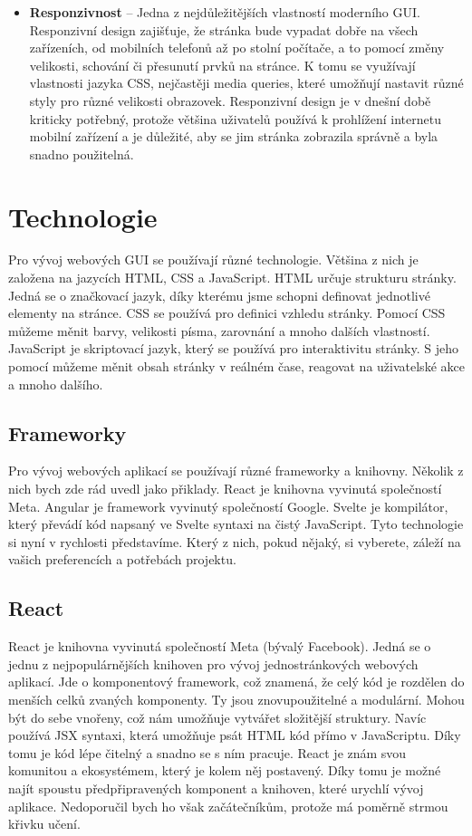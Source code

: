 \begin{itemize}
  \item \textbf{Responzivnost} -- Jedna z nejdůležitějších vlastností moderního GUI. Responzivní design zajišťuje, že stránka bude vypadat dobře na všech zařízeních, od mobilních telefonů až po stolní počítače, a to pomocí změny velikosti, schování či přesunutí prvků na stránce. K tomu se využívají vlastnosti jazyka CSS, nejčastěji media queries, které umožňují nastavit různé styly pro různé velikosti obrazovek. Responzivní design je v dnešní době kriticky potřebný, protože většina uživatelů používá k prohlížení internetu mobilní zařízení a je důležité, aby se jim stránka zobrazila správně a byla snadno použitelná.
\end{itemize}

\section{Technologie}
\label{sec:technologies}

Pro vývoj webových GUI se používají různé technologie. Většina z nich je založena na jazycích HTML, CSS a JavaScript. HTML určuje strukturu stránky. Jedná se o značkovací jazyk, díky kterému jsme schopni definovat jednotlivé elementy na stránce. CSS se používá pro definici vzhledu stránky. Pomocí CSS můžeme měnit barvy, velikosti písma, zarovnání a mnoho dalších vlastností. JavaScript je skriptovací jazyk, který se používá pro interaktivitu stránky. S jeho pomocí můžeme měnit obsah stránky v reálném čase, reagovat na uživatelské akce a mnoho dalšího.

\subsection{Frameworky}
\label{subsec:frameworks}

Pro vývoj webových aplikací se používají různé frameworky a knihovny. Několik z nich bych zde rád uvedl jako přiklady. React je knihovna vyvinutá společností Meta. Angular je framework vyvinutý společností Google. Svelte je kompilátor, který převádí kód napsaný ve Svelte syntaxi na čistý JavaScript. Tyto technologie si nyní v rychlosti představíme. Který z nich, pokud nějaký, si vyberete, záleží na vašich preferencích a potřebách projektu.

\subsection*{React}
\label{subsec:react}

React je knihovna vyvinutá společností Meta (bývalý Facebook). Jedná se o jednu z nejpopulárnějších knihoven pro vývoj jednostránkových webových aplikací. Jde o komponentový framework, což znamená, že celý kód je rozdělen do menších celků zvaných komponenty. Ty jsou znovupoužitelné a modulární. Mohou být do sebe vnořeny, což nám umožňuje vytvářet složitější struktury. Navíc používá JSX syntaxi, která umožňuje psát HTML kód přímo v JavaScriptu. Díky tomu je kód lépe čitelný a snadno se s ním pracuje. React je znám svou komunitou a ekosystémem, který je kolem něj postavený. Díky tomu je možné najít spoustu předpřipravených komponent a knihoven, které urychlí vývoj aplikace. Nedoporučil bych ho však začátečníkům, protože má poměrně strmou křivku učení.

